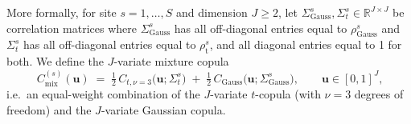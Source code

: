 \documentclass[
  12pt]{article}
\newcommand{\rhou}[1]{\rho_{\text{#1}}}
\newcommand{\rG}[1]{\rho_{\mathrm{Gauss}}_{#1}}
\newcommand{\rT}[1]{\rho_{t}_{#1}}
\newcommand{\RG}[1]{\Sigma_{\mathrm{Gauss}}^{#1}}   %
\newcommand{\RT}[1]{\Sigma_{t}^{#1}}                %
\begin{document}
% 
% 

More formally, for site $s=1,\dots,S$ and dimension $J\ge2$, let $\RG{s},\RT{s}\in\mathbb{R}^{J\times J}$ be correlation matrices where $\RG{s}$ has all off-diagonal entries equal to $\rhou{Gauss}^s$ and $\RT{s}$ has all off-diagonal entries equal to $\rhou{t}^s$, and all diagonal entries equal to 1 for both.
We define the $J$-variate mixture copula
\begin{equation} ~\label{eq:mix_copula}
  C_{\mathrm{mix}}^{(s)}(\mathbf{u})
  \;=\; \tfrac{1}{2}\,C_{t,\nu=3}\!\big(\mathbf{u};\RT{s}\big)
       \;+\; \tfrac{1}{2}\,C_{\mathrm{Gauss}}\!\big(\mathbf{u};\RG{s}\big),
  \qquad \mathbf{u}\in[0,1]^J,
\end{equation}
i.e.\ an equal-weight combination of the $J$-variate $t$-copula (with $\nu=3$ degrees of freedom) and the $J$-variate Gaussian copula.
\end{document}
